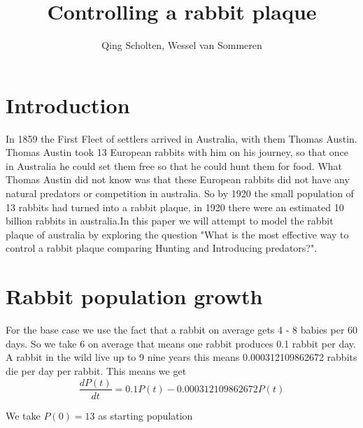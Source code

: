 \documentclass{article}
\author{Qing Scholten, Wessel van Sommeren}
\title{Controlling a rabbit plaque}
\begin{document}
\maketitle
\newpage
\tableofcontents
\newpage

\section{Introduction}
In 1859 the First Fleet of settlers arrived in Australia, with them Thomas Austin. Thomas Austin took 13 European rabbits with him on his journey, so that once in Australia he could set them free so that he could hunt them for food. What Thomas Austin did not know was that these European rabbits did not have any natural predators or competition in australia. So by 1920 the small population of 13 rabbits had turned into a rabbit plaque, in 1920 there were an estimated 10 billion rabbits in australia.In this paper we will attempt to model the rabbit plaque of australia by exploring the question "What is the most effective way to control a rabbit plaque comparing Hunting and Introducing predators?".
\section{Rabbit population growth}
For the base case we use the fact that a rabbit on average gets 4 - 8 babies per 60 days. So we take 6 on average that means one rabbit produces 0.1 rabbit per day. A rabbit in the wild live up to 9 nine years this means 0.000312109862672 rabbits die per day per rabbit. This means we get 
$$
\frac{dP(t)}{dt} = 0.1P(t)-0.000312109862672P(t)
$$

We take $P(0) = 13$ as starting population
\\
\end{document}
